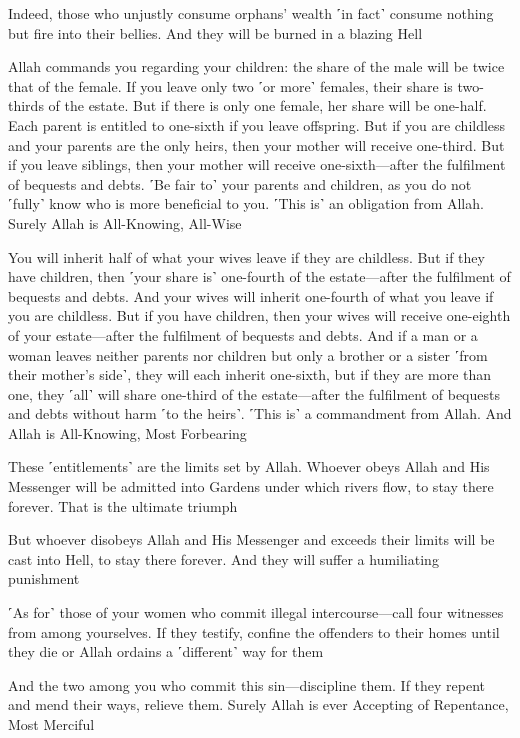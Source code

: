 Indeed, those who unjustly consume orphans’ wealth ˹in fact˺ consume nothing but fire into their bellies. And they will be burned in a blazing Hell

Allah commands you regarding your children: the share of the male will be twice that of the female. If you leave only two ˹or more˺ females, their share is two-thirds of the estate. But if there is only one female, her share will be one-half. Each parent is entitled to one-sixth if you leave offspring. But if you are childless and your parents are the only heirs, then your mother will receive one-third. But if you leave siblings, then your mother will receive one-sixth—after the fulfilment of bequests and debts. ˹Be fair to˺ your parents and children, as you do not ˹fully˺ know who is more beneficial to you. ˹This is˺ an obligation from Allah. Surely Allah is All-Knowing, All-Wise

You will inherit half of what your wives leave if they are childless. But if they have children, then ˹your share is˺ one-fourth of the estate—after the fulfilment of bequests and debts. And your wives will inherit one-fourth of what you leave if you are childless. But if you have children, then your wives will receive one-eighth of your estate—after the fulfilment of bequests and debts. And if a man or a woman leaves neither parents nor children but only a brother or a sister ˹from their mother’s side˺, they will each inherit one-sixth, but if they are more than one, they ˹all˺ will share one-third of the estate—after the fulfilment of bequests and debts without harm ˹to the heirs˺. ˹This is˺ a commandment from Allah. And Allah is All-Knowing, Most Forbearing

These ˹entitlements˺ are the limits set by Allah. Whoever obeys Allah and His Messenger will be admitted into Gardens under which rivers flow, to stay there forever. That is the ultimate triumph

But whoever disobeys Allah and His Messenger and exceeds their limits will be cast into Hell, to stay there forever. And they will suffer a humiliating punishment

˹As for˺ those of your women who commit illegal intercourse—call four witnesses from among yourselves. If they testify, confine the offenders to their homes until they die or Allah ordains a ˹different˺ way for them

And the two among you who commit this sin—discipline them. If they repent and mend their ways, relieve them. Surely Allah is ever Accepting of Repentance, Most Merciful

